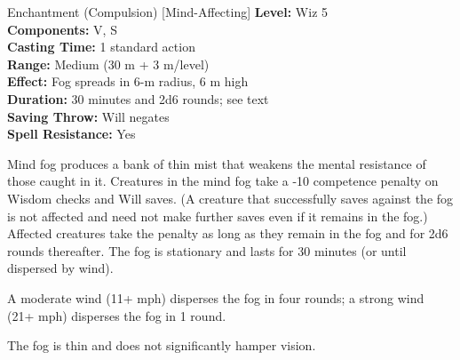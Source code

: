 {Enchantment (Compulsion) [Mind-Affecting]}
{
	\textbf{Level:}
	Wiz 5\\
	\textbf{Components:}
	V, S\\
	\textbf{Casting Time:}
	1 standard action\\
	\textbf{Range:}
	Medium (30 m + 3 m/level)\\
	\textbf{Effect:}
	Fog spreads in 6-m radius, 6 m high\\
	\textbf{Duration:}
	30 minutes and 2d6 rounds; see text\\
	\textbf{Saving Throw:}
	Will negates\\
	\textbf{Spell Resistance:}
	Yes\\
}
{
	Mind fog produces a bank of thin mist that weakens the mental resistance of those caught in it. Creatures in the mind fog take a -10 competence penalty on Wisdom checks and Will saves. (A creature that successfully saves against the fog is not affected and need not make further saves even if it remains in the fog.) Affected creatures take the penalty as long as they remain in the fog and for 2d6 rounds thereafter. The fog is stationary and lasts for 30 minutes (or until dispersed by wind).

	A moderate wind (11+ mph) disperses the fog in four rounds; a strong wind (21+ mph) disperses the fog in 1 round.

	The fog is thin and does not significantly hamper vision.

}
